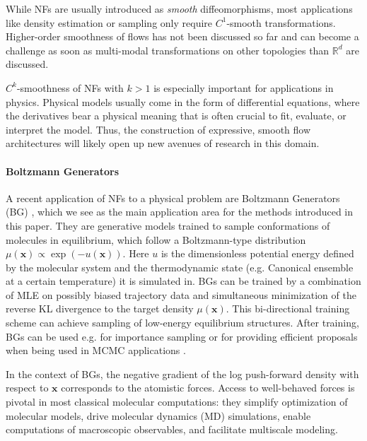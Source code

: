 \documentclass{article}
\begin{document}
While NFs are usually introduced as \textit{smooth} diffeomorphisms, most applications like density estimation or sampling only require $C^{1}$-smooth transformations.
Higher-order smoothness of flows has not been discussed so far and can become a challenge as soon as multi-modal transformations on other topologies than $\mathbb{R}^d$ are discussed. 

$C^{k}$-smoothness of NFs with $k > 1$ is especially important for applications in physics. Physical models usually come in the form of differential equations, where the derivatives bear a physical meaning that is often crucial to fit, evaluate, or interpret the model. Thus, the construction of expressive, smooth flow architectures will likely open up new avenues of research in this domain. 

\paragraph{Boltzmann Generators}
A recent application of NFs to a physical problem are Boltzmann Generators (BG) \cite{noe2019boltzmann}, which we see as the main application area for the methods introduced in this paper. They are generative models trained to sample conformations of molecules in equilibrium, which follow a Boltzmann-type distribution $\mu(\bm x) \propto \exp(-u(\bm x))$. Here $u$ is the dimensionless potential energy defined by the molecular system and the thermodynamic state (e.g. Canonical ensemble at a certain temperature) it is simulated in. BGs can be trained by a combination of MLE on possibly biased trajectory data and simultaneous minimization of the reverse KL divergence to the target density $\mu(\bm x)$. This bi-directional training scheme can achieve sampling of low-energy equilibrium structures. After training, BGs can be used e.g. for importance sampling or for providing efficient proposals when being used in MCMC applications \cite{sbailo2021neural}. 

In the context of BGs, the negative gradient of the log push-forward density with respect to $\bm x$ corresponds to the atomistic forces. Access to well-behaved forces is pivotal in most classical molecular computations: they simplify optimization of molecular models, drive molecular dynamics (MD) simulations, enable computations of macroscopic observables, and facilitate multiscale modeling.
\end{document}
